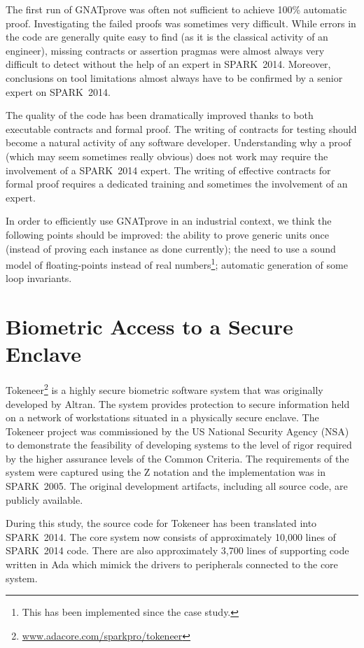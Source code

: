 \documentclass[10pt,a4paper,twocolumn]{article}
\newcommand{\gnatprove}{GNATprove\xspace}
\newcommand{\oldspark}{SPARK~2005\xspace}
\newcommand{\newspark}{SPARK~2014\xspace}
\begin{document}
The first run of \gnatprove was often not sufficient to achieve 100\%
automatic proof. Investigating the failed proofs was sometimes very
difficult. While errors in the code are generally quite easy to find
(as it is the classical activity of an engineer), missing contracts or
assertion pragmas were almost always very difficult to detect without
the help of an expert in \newspark. Moreover, conclusions on tool
limitations almost always have to be confirmed by a senior expert on
\newspark.

The quality of the code has been dramatically improved thanks to both
executable contracts and formal proof. The writing of contracts for
testing should become a natural activity of any software
developer. Understanding why a proof (which may seem sometimes really
obvious) does not work may require the involvement of a \newspark
expert. The writing of effective contracts for formal proof requires a
dedicated training and sometimes the involvement of an expert.

In order to efficiently use \gnatprove in an industrial context, we
think the following points should be improved: the ability to prove
generic units once (instead of proving each instance as done
currently); the need to use a sound model of floating-points instead
of real numbers\footnote{This has been implemented since the case study.}; 
automatic generation of some loop invariants.

\section{Biometric Access to a Secure Enclave}
\label{sec:tokeneer}

Tokeneer\footnote{\url{www.adacore.com/sparkpro/tokeneer}} is a highly
secure biometric software system that was originally developed by
Altran. The system provides protection to secure information held on a
network of workstations situated in a physically secure enclave. The
Tokeneer project was commissioned by the US National Security Agency
(NSA) to demonstrate the feasibility of developing systems to the
level of rigor required by the higher assurance levels of the Common
Criteria. The requirements of the system were captured using the Z
notation and the implementation was in \oldspark. The original
development artifacts, including all source code, are publicly
available.

During this study, the source code for Tokeneer has been translated
into \newspark. The core system now consists of approximately 10,000
lines of \newspark code. There are also approximately 3,700 lines of
supporting code written in Ada which mimick the drivers to peripherals
connected to the core system.
\end{document}
